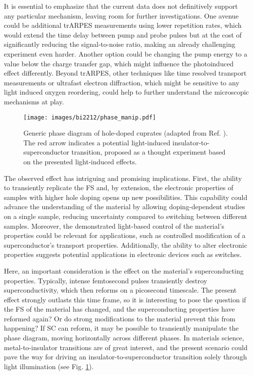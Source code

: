 It is essential to emphasize that the current data does not definitively support any particular mechanism, leaving room for further investigations.
One avenue could be additional trARPES measurements using lower repetition rates, which would extend the time delay between pump and probe pulses but at the cost of significantly reducing the signal-to-noise ratio, making an already challenging experiment even harder.
Another option could be changing the pump energy to a value below the charge transfer gap, which might influence the photoinduced effect differently.
Beyond trARPES, other techniques like time resolved transport measurements or ultrafast electron diffraction, which might be sensitive to any light induced oxygen reordering, could help to further understand the microscopic mechanisms at play.

\begin{figure}[t!]
	\centering
	\texttt{[image: images/bi2212/phase\_manip.pdf]}
	\caption{Generic phase diagram of hole-doped cuprates (adapted from Ref. \cite{keimer_quantum_2015}). The red arrow indicates a potential light-induced insulator-to-superconductor transition, proposed as a thought experiment based on the presented light-induced effects.}
	\label{fig:phasemanip}
\end{figure}

The observed effect has intriguing and promising implications.
First, the ability to transiently replicate the FS and, by extension, the electronic properties of samples with higher hole doping opens up new possibilities.
This capability could advance the understanding of the material by allowing doping-dependent studies on a single sample, reducing uncertainty compared to switching between different samples.
Moreover, the demonstrated light-based control of the material's properties could be relevant for applications, such as controlled modification of a superconductor’s transport properties.
Additionally, the ability to alter electronic properties suggests potential applications in electronic devices such as switches.

Here, an important consideration is the effect on the material’s superconducting properties.
Typically, intense femtosecond pulses transiently destroy superconductivity, which then reforms on a picosecond timescale.
The present effect strongly outlasts this time frame, so it is interesting to pose the question if the FS of the material has changed, and the superconducting properties have reformed again?
Or do strong modifications to the material prevent this from happening?
If SC can reform, it may be possible to transiently manipulate the phase diagram, moving horizontally across different phases.
In materials science, metal-to-insulator transitions are of great interest, and the present scenario could pave the way for driving an insulator-to-superconductor transition solely through light illumination (see Fig. \ref{fig:phasemanip}).

